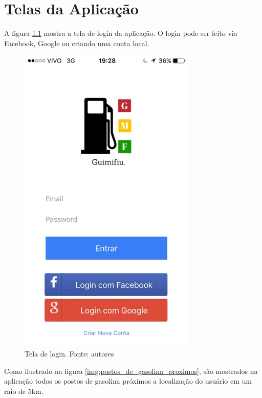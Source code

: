 
\chapter{Telas da Aplicação}
\label{chap:telas}

A figura \ref{img:tela_de_login} mostra a tela de login da aplicação. O login pode ser feito via Facebook, Google ou criando uma conta local.

\begin{figure}[H]
    \centering
    \includegraphics[scale=0.5]{figuras/app_1.jpg}
    \caption[Tela de login]{Tela de login. Fonte: autores}
    \label{img:tela_de_login}
\end{figure}

Como ilustrado na figura \ref{img:postos_de_gasolina_proximos}, são mostrados na aplicação todos os postos de gasolina próximos a localização do usuário em um raio de 5km.

